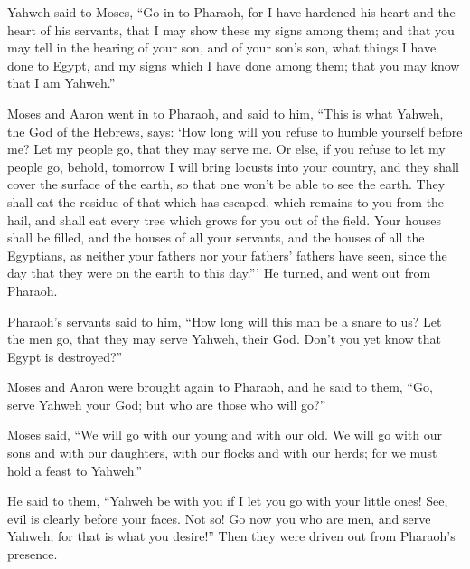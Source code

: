  Yahweh said to Moses, ``Go in to Pharaoh, for I have
hardened his heart and the heart of his servants, that I may show these
my signs among them;  and that you may tell in the hearing
of your son, and of your son's son, what things I have done to Egypt,
and my signs which I have done among them; that you may know that I am
Yahweh.''

 Moses and Aaron went in to Pharaoh, and said to him, ``This
is what Yahweh, the God of the Hebrews, says: `How long will you refuse
to humble yourself before me? Let my people go, that they may serve me.
 Or else, if you refuse to let my people go, behold,
tomorrow I will bring locusts into your country,  and they
shall cover the surface of the earth, so that one won't be able to see
the earth. They shall eat the residue of that which has escaped, which
remains to you from the hail, and shall eat every tree which grows for
you out of the field.  Your houses shall be filled, and the
houses of all your servants, and the houses of all the Egyptians, as
neither your fathers nor your fathers' fathers have seen, since the day
that they were on the earth to this day.''' He turned, and went out from
Pharaoh.

 Pharaoh's servants said to him, ``How long will this man be
a snare to us? Let the men go, that they may serve Yahweh, their God.
Don't you yet know that Egypt is destroyed?''

 Moses and Aaron were brought again to Pharaoh, and he said
to them, ``Go, serve Yahweh your God; but who are those who will go?''

 Moses said, ``We will go with our young and with our old.
We will go with our sons and with our daughters, with our flocks and
with our herds; for we must hold a feast to Yahweh.''

 He said to them, ``Yahweh be with you if I let you go with
your little ones! See, evil is clearly before your faces. 
Not so! Go now you who are men, and serve Yahweh; for that is what you
desire!'' Then they were driven out from Pharaoh's presence.

